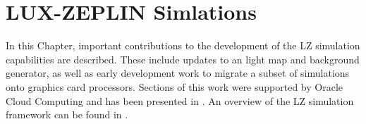 \chapter{LUX-ZEPLIN Simlations}
\par
In this Chapter, important contributions to the development of the LZ simulation capabilities are described.
These include updates to an light map and background generator, as well as early development work to migrate a subset of simulations onto graphics card processors.
Sections of this work were supported by Oracle Cloud Computing and has been presented in \cite{se_poster_2018,se_poster_2019_summerschool,se_poster_2019_bristol,SEriksen_IoP_2021_talk_ref}.
An overview of the LZ simulation framework can be found in \cite{lz_simulations_ref}.






